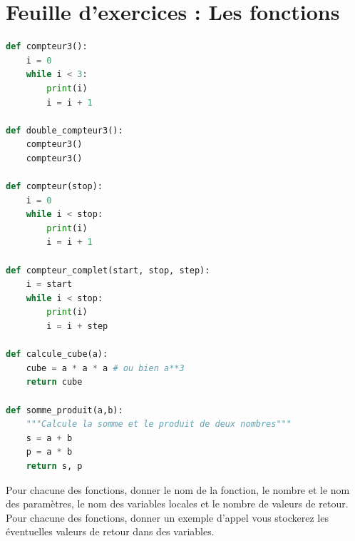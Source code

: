\setcounter{Exercise}{0}

\chapter*{Feuille d'exercices : Les fonctions}

\begin{Exercise}[title={Appréhendez une définition de fonction}]

\begin{lstlisting}[style=pythonstyle, language=Python]
def compteur3():
    i = 0
    while i < 3:
        print(i)
        i = i + 1

def double_compteur3():
    compteur3()
    compteur3()

def compteur(stop):
    i = 0
    while i < stop:
        print(i)
        i = i + 1

def compteur_complet(start, stop, step):
    i = start
    while i < stop:
        print(i)
        i = i + step

def calcule_cube(a):
    cube = a * a * a # ou bien a**3
    return cube

def somme_produit(a,b):
    """Calcule la somme et le produit de deux nombres"""
    s = a + b
    p = a * b
    return s, p
\end{lstlisting}
\Question Pour chacune des fonctions, donner le nom de la fonction, le nombre et le nom des paramètres, le nom des variables locales et le nombre de valeurs de retour.
\Question Pour chacune des fonctions, donner un exemple d'appel vous stockerez les éventuelles valeurs de retour dans des variables.
\end{Exercise}



\newpage

